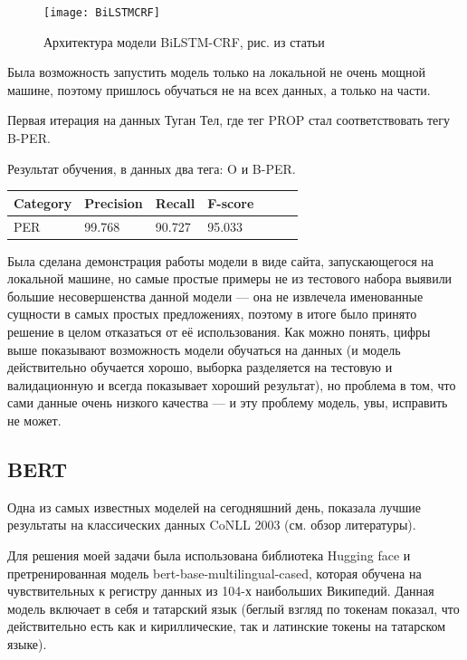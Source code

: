 \begin{figure}[H]
\caption{Архитектура модели BiLSTM-CRF, рис. из статьи \cite{ju-etal-2018-neural}}
\texttt{[image: BiLSTMCRF]}
\label{fig:BiLSTMCRF}
\end{figure}


Была возможность запустить модель только на локальной не очень мощной машине, поэтому пришлось обучаться не на всех данных, а только на части.

Первая итерация на данных Туган Тел, где тег PROP стал соответствовать тегу B-PER.

Результат обучения, в данных два тега: O и B-PER.


\medskip

\begin{tabular}{| l | l | l | l | l | l | l |}
\hline
Category               & Precision  &   Recall   &  F-score   \\

\hline
 PER                                 & 99.768     & 90.727     & 95.033      \\
\hline
\end{tabular}


Была сделана демонстрация работы модели в виде сайта, запускающегося на локальной машине, но самые простые примеры не из тестового набора выявили большие несовершенства данной модели --- она не извлечела именованные сущности в самых простых предложениях, поэтому в итоге было принято решение в целом отказаться от её использования. %
Как можно понять, цифры выше показывают возможность модели обучаться на данных (и модель действительно обучается хорошо, выборка разделяется на тестовую и валидационную и всегда показывает хороший результат), но проблема в том, что сами данные очень низкого качества --- и эту проблему модель, увы, исправить не может.


\subsection{BERT}

\cite{DBLP:journals/corr/abs-1810-04805} Одна из самых известных моделей на сегодняшний день, показала лучшие результаты на классических данных CoNLL 2003 (см. обзор литературы).

Для решения моей задачи была использована библиотека Hugging face \cite{Wolf2019HuggingFacesTS} и претренированная модель bert-base-multilingual-cased, которая обучена на чувствительных к регистру данных из 104-х наибольших Википедий. Данная модель включает в себя и татарский язык (беглый взгляд по токенам показал, что действительно есть как и кириллические, так и латинские токены на татарском языке). 

